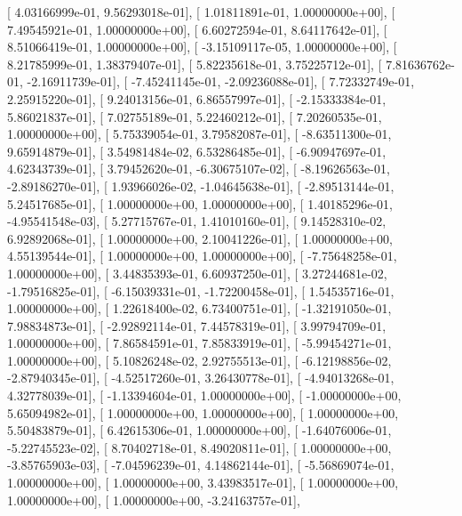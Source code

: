 \documentclass{article}
\begin{document}
       [  4.03166999e-01,   9.56293018e-01],
       [  1.01811891e-01,   1.00000000e+00],
       [  7.49545921e-01,   1.00000000e+00],
       [  6.60272594e-01,   8.64117642e-01],
       [  8.51066419e-01,   1.00000000e+00],
       [ -3.15109117e-05,   1.00000000e+00],
       [  8.21785999e-01,   1.38379407e-01],
       [  5.82235618e-01,   3.75225712e-01],
       [  7.81636762e-01,  -2.16911739e-01],
       [ -7.45241145e-01,  -2.09236088e-01],
       [  7.72332749e-01,   2.25915220e-01],
       [  9.24013156e-01,   6.86557997e-01],
       [ -2.15333384e-01,   5.86021837e-01],
       [  7.02755189e-01,   5.22460212e-01],
       [  7.20260535e-01,   1.00000000e+00],
       [  5.75339054e-01,   3.79582087e-01],
       [ -8.63511300e-01,   9.65914879e-01],
       [  3.54981484e-02,   6.53286485e-01],
       [ -6.90947697e-01,   4.62343739e-01],
       [  3.79452620e-01,  -6.30675107e-02],
       [ -8.19626563e-01,  -2.89186270e-01],
       [  1.93966026e-02,  -1.04645638e-01],
       [ -2.89513144e-01,   5.24517685e-01],
       [  1.00000000e+00,   1.00000000e+00],
       [  1.40185296e-01,  -4.95541548e-03],
       [  5.27715767e-01,   1.41010160e-01],
       [  9.14528310e-02,   6.92892068e-01],
       [  1.00000000e+00,   2.10041226e-01],
       [  1.00000000e+00,   4.55139544e-01],
       [  1.00000000e+00,   1.00000000e+00],
       [ -7.75648258e-01,   1.00000000e+00],
       [  3.44835393e-01,   6.60937250e-01],
       [  3.27244681e-02,  -1.79516825e-01],
       [ -6.15039331e-01,  -1.72200458e-01],
       [  1.54535716e-01,   1.00000000e+00],
       [  1.22618400e-02,   6.73400751e-01],
       [ -1.32191050e-01,   7.98834873e-01],
       [ -2.92892114e-01,   7.44578319e-01],
       [  3.99794709e-01,   1.00000000e+00],
       [  7.86584591e-01,   7.85833919e-01],
       [ -5.99454271e-01,   1.00000000e+00],
       [  5.10826248e-02,   2.92755513e-01],
       [ -6.12198856e-02,  -2.87940345e-01],
       [ -4.52517260e-01,   3.26430778e-01],
       [ -4.94013268e-01,   4.32778039e-01],
       [ -1.13394604e-01,   1.00000000e+00],
       [ -1.00000000e+00,   5.65094982e-01],
       [  1.00000000e+00,   1.00000000e+00],
       [  1.00000000e+00,   5.50483879e-01],
       [  6.42615306e-01,   1.00000000e+00],
       [ -1.64076006e-01,  -5.22745523e-02],
       [  8.70402718e-01,   8.49020811e-01],
       [  1.00000000e+00,  -3.85765903e-03],
       [ -7.04596239e-01,   4.14862144e-01],
       [ -5.56869074e-01,   1.00000000e+00],
       [  1.00000000e+00,   3.43983517e-01],
       [  1.00000000e+00,   1.00000000e+00],
       [  1.00000000e+00,  -3.24163757e-01],
\end{document}

